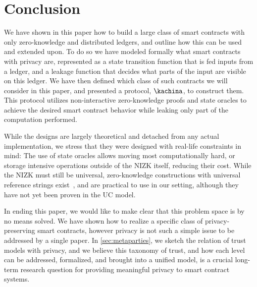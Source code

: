 \section{Conclusion}

We have shown in this paper how to build a large class of smart contracts with
only zero-knowledge and distributed ledgers, and outline how this can be used
and extended upon. To do so we have modeled formally what smart contracts with
privacy are, represented as a state transition function that is fed inputs from
a ledger, and a leakage function that decides what parts of the input are
visible on this ledger. We have then defined which class of such contracts we
will consider in this paper, and presented a protocol, $\kachina$, to construct
them. This protocol utilizes
non-interactive zero-knowledge proofs and state oracles to achieve the desired
smart contract behavior while leaking only part of the computation performed.

While the designs are largely theoretical and detached from any actual
implementation, we stress that they were designed with real-life constraints in
mind: The use of state oracles allows moving most computationally hard, or
storage intensive operations outside of the NIZK itself, reducing their cost.
While the NIZK must still be universal, zero-knowledge constructions with
universal reference strings exist~\cite{CCS:MBKM19}, and are practical to use in our
setting, although they have not yet been proven in the UC model.

In ending this paper, we would like to make clear that this problem space is by
no means solved. We have shown how to realize a specific class of
privacy-preserving smart contracts, however privacy is not such a simple issue
to be addressed by a single paper. In \iffull\autoref{sec:metaparties}\else\cite[Appendix~I]{fullversion}\fi, we sketch
the relation of trust models with privacy, and we believe this taxonomy of
trust, and how each level can be addressed, formalized, and brought into a
unified model, is a crucial long-term research question for providing meaningful
privacy to smart contract systems.

